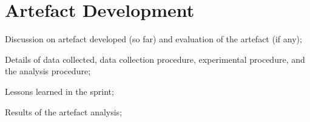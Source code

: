 \section{Artefact Development}
\begin{todolist}
    \item[\done] Discussion on artefact developed (so far) and evaluation of the artefact (if any);
    \item Details of data collected, data collection procedure, experimental procedure, and the analysis procedure;
    \item Lessons learned in the sprint;
    \item Results of the artefact analysis;
\end{todolist}




